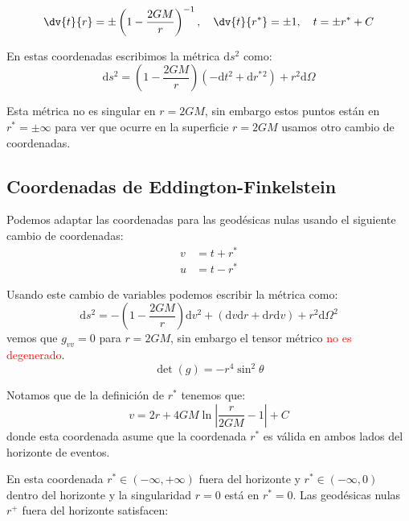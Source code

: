\documentclass[../main]{subfiles}
\begin{document}
\begin{equation}
    \dv{t}{r}=\pm\left(1-\dfrac{2GM}{r}\right)^{-1},\quad \dv{t}{r^*}=\pm 1,\quad t=\pm r^*+C
\end{equation}

En estas coordenadas escribimos la métrica $\mathrm{d}s^2$ como:
\begin{equation}
    \mathrm{d}s^2=\left(1-\dfrac{2GM}{r}\right)(-\mathrm{d}t^2+\mathrm{d}r^*{}^2)+r^2\mathrm{d}\Omega
\end{equation}

Esta métrica no es singular en $r=2GM$, sin embargo estos puntos están en $r^*=\pm \infty$ para ver que ocurre en la superficie $r=2GM$ usamos otro cambio de coordenadas.

\subsection{Coordenadas de Eddington-Finkelstein}

Podemos adaptar las coordenadas para las geodésicas nulas usando el siguiente cambio de coordenadas:
\begin{equation}
    \begin{split}
        v&=t+r^*\\
        u&=t-r^*
    \end{split}
\end{equation} 

Usando este cambio de variables podemos escribir la métrica como:
\begin{equation}
    \mathrm{d}s^2=-\left(1-\dfrac{2GM}{r}\right)\mathrm{d}v^2+(\mathrm{d}v\mathrm{d}r+\mathrm{d}r\mathrm{d}v)+r^2\mathrm{d}\Omega^2
\end{equation}
vemos que $g_{vv}=0$ para $r=2GM$, sin embargo el tensor métrico \textcolor{red}{no es degenerado}.
\begin{equation}
    \det(g)=-r^4 \sin^2 \theta
\end{equation}

Notamos que de la definición de $r^*$ tenemos que:
\begin{equation}
    v=2r+4GM\ln \left| \dfrac{r}{2GM}-1 \right|+C
\end{equation}
donde esta coordenada asume que la coordenada $r^*$ es válida en ambos lados del horizonte de eventos.

En esta coordenada $r^* \in (-\infty, +\infty)$ fuera del horizonte y $r^* \in (-\infty, 0)$ dentro del horizonte y la singularidad $r=0$ está en $r^*=0$. Las geodésicas nulas $r^+$ fuera del horizonte satisfacen:
\end{document}
